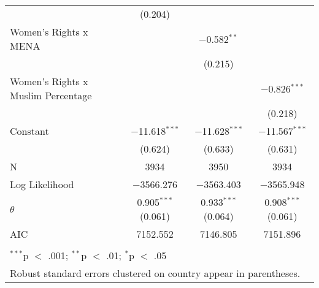\begin{table}[!htbp]
\begin{tabular}{@{\extracolsep{5pt}}lccc}
  & (0.204) &  &  \\ 
  Women's Rights x MENA &  & $-$0.582$^{**}$ &  \\ 
  &  & (0.215) &  \\ 
  Women's Rights x Muslim Percentage &  &  & $-$0.826$^{***}$ \\ 
  &  &  & (0.218) \\ 
  Constant & $-$11.618$^{***}$ & $-$11.628$^{***}$ & $-$11.567$^{***}$ \\ 
  & (0.624) & (0.633) & (0.631) \\ 
 N & 3934 & 3950 & 3934 \\ 
Log Likelihood & $-$3566.276 & $-$3563.403 & $-$3565.948 \\ 
$\theta$ & 0.905$^{***}$  (0.061) & 0.933$^{***}$  (0.064) & 0.908$^{***}$  (0.061) \\ 
AIC & 7152.552 & 7146.805 & 7151.896 \\ 
\hline \\[-1.8ex] 
\multicolumn{4}{l}{$^{***}$p $<$ .001; $^{**}$p $<$ .01; $^{*}$p $<$ .05} \\ 
\multicolumn{4}{l}{Robust standard errors clustered on country appear in parentheses.} \\ 
\end{tabular} 
\end{table} 
